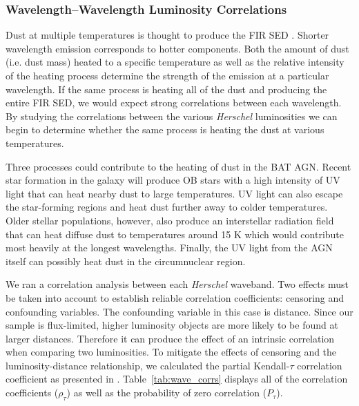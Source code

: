 \subsubsection{Wavelength--Wavelength Luminosity Correlations}
Dust at multiple temperatures is thought to produce the FIR SED \citep{Draine:2003gd}. Shorter wavelength emission corresponds to hotter components. Both the amount of dust (i.e. dust mass) heated to a specific temperature as well as the relative intensity of the heating process determine the strength of the emission at a particular wavelength. If the same process is heating all of the dust and producing the entire FIR SED, we would expect strong correlations between each wavelength. By studying the correlations between the various \textit{Herschel} luminosities we can begin to determine whether the same process is heating the dust at various temperatures.

Three processes could contribute to the heating of dust in the BAT AGN. Recent star formation in the galaxy will produce OB stars with a high intensity of UV light that can heat nearby dust to large temperatures. UV light can also escape the star-forming regions and heat dust further away to colder temperatures. Older stellar populations, however, also produce an interstellar radiation field that can heat diffuse dust to temperatures around 15 K which would contribute most heavily at the longest wavelengths. Finally, the UV light from the AGN itself can possibly heat dust in the circumnuclear region.

We ran a correlation analysis between each \textit{Herschel} waveband. Two effects must be taken into account to establish reliable correlation coefficients: censoring and confounding variables. The confounding variable in this case is distance. Since our sample is flux-limited, higher luminosity objects are more likely to be found at larger distances. Therefore it can produce the effect of an intrinsic correlation when comparing two luminosities. To mitigate the effects of censoring and the luminosity-distance relationship, we calculated the partial Kendall-$\tau$ correlation coefficient as presented in \citet{Akritas_1996}. Table~\ref{tab:wave_corrs} displays all of the correlation coefficients ($\rho_{\tau}$) as well as the probability of zero correlation ($P_{\tau}$). 